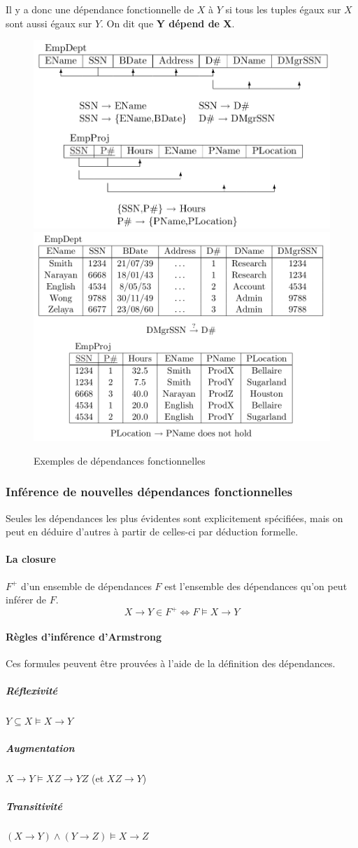 \documentclass[a4paper]{article}
\begin{document}
Il y a donc une dépendance fonctionnelle de $X$ à $Y$ si tous les tuples égaux
sur $X$ sont aussi égaux sur $Y$. On dit que \textbf{Y dépend de X}.

\begin{figure}[H]
\center
\includegraphics[width=.48\textwidth]{fig/df-ex1.png}
\includegraphics[width=.48\textwidth]{fig/df-ex2.png}
\caption{Exemples de dépendances fonctionnelles}
\end{figure}

\subsubsection{Inférence de nouvelles dépendances fonctionnelles}
Seules les dépendances les plus évidentes sont explicitement spécifiées, mais on
peut en déduire d'autres à partir de celles-ci par déduction formelle.

\paragraph{La closure} $F^+$ d'un ensemble de dépendances $F$ est l'ensemble des
dépendances qu'on peut inférer de $F$.
$$ X \rightarrow Y \in F^+ \Leftrightarrow F \models X \rightarrow Y $$

\paragraph{Règles d'inférence d'Armstrong}
Ces formules peuvent être prouvées à l'aide de la définition des dépendances.
\subparagraph{Réflexivité} $ Y \subseteq X \models X \rightarrow Y $
\subparagraph{Augmentation} $ X \rightarrow Y \models XZ \rightarrow YZ $ (et $ XZ \rightarrow Y$)
\subparagraph{Transitivité} $ (X \rightarrow Y) \land (Y \rightarrow Z) \models X \rightarrow Z $
\end{document}

